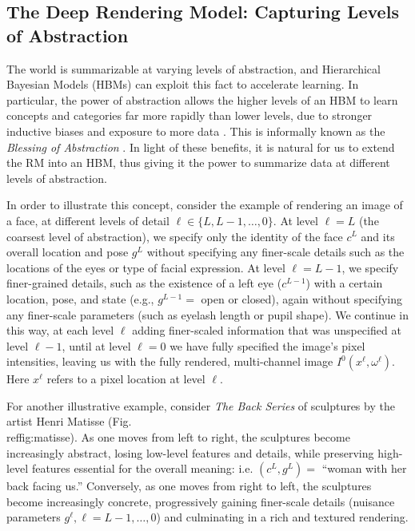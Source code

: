 \documentclass[12pt]{article}
\begin{document}
\subsection{The Deep Rendering Model: Capturing Levels of Abstraction}
\label{sec:drma}

The world is summarizable at varying levels of abstraction, and Hierarchical Bayesian Models (HBMs) can exploit this fact to accelerate learning. In particular, the power of abstraction allows the higher levels of an HBM to learn concepts and categories far more rapidly than lower levels, due to stronger inductive biases and exposure to more data \cite{tenenbaum2011grow}. This is informally known as the \emph{Blessing of Abstraction} \cite{tenenbaum2011grow}. In light of these benefits, it is natural for us to extend the RM into an HBM, thus giving it the power to summarize data at different levels of abstraction.

In order to illustrate this concept, consider the example of rendering an image of a face, at different levels of detail $\ell \in \{L,L-1,\ldots ,0 \}$. At level $\ell=L$ (the coarsest level of abstraction), we specify only the identity of the face $c^L$ and its overall location and pose $g^L$ without specifying any finer-scale details such as the locations of the eyes or type of facial expression. At level $\ell=L-1$, we specify finer-grained details, such as the existence of a left eye ($c^{L-1}$) with a certain location, pose, and state (e.g., $g^{L-1}=$ open or closed),  again without specifying any finer-scale parameters (such as eyelash length or pupil shape). 
We continue in this way, at each level $\ell$ adding finer-scaled information that was unspecified at level $\ell-1$, until at level $\ell=0$ we have fully specified the image's pixel intensities, leaving us with the fully rendered, multi-channel image $I^{0}(x^{\ell},\omega^{\ell})$. Here $x^{\ell}$ refers to a pixel location at level $\ell$.

For another illustrative example, consider {\it The Back Series} of sculptures by the artist Henri Matisse (Fig.\\ref{fig:matisse}). As one moves from left to right, the sculptures become increasingly abstract, losing low-level features and details, while preserving high-level features essential for the overall meaning: i.e. $(c^L,g^L) =$ ``woman with her back facing us.'' Conversely, as one moves from right to left, the sculptures become increasingly concrete, progressively gaining finer-scale details (nuisance parameters $g^\ell, \ell = L-1,\dots,0$) and culminating in a rich and textured rendering.
\end{document}
